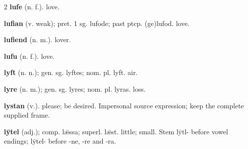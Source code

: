 \begin{multicols*}{2}
\textbf{lufe} (n. f.). love.\par
\textbf{lufian} (v. weak); pret. 1 sg. lufode; past ptcp. (ge)lufod. love.\par
\textbf{lufiend} (n. m.). lover.\par
\textbf{lufu} (n. f.). love.\par
\textbf{lyft} (n. n.); gen. sg. lyftes; nom. pl. lyft. air.\par
\textbf{lyre} (n. m.); gen. sg. lyres; nom. pl. lyras. loss.\par
\textbf{lystan} (v.). please; be desired. Impersonal source expression; keep the complete supplied frame.\par
\textbf{lȳtel} (adj.); comp. lǣssa; superl. lǣst. little; small. Stem lȳtl- before vowel endings; lȳtel- before -ne, -re and -ra.\par

\end{multicols*}
